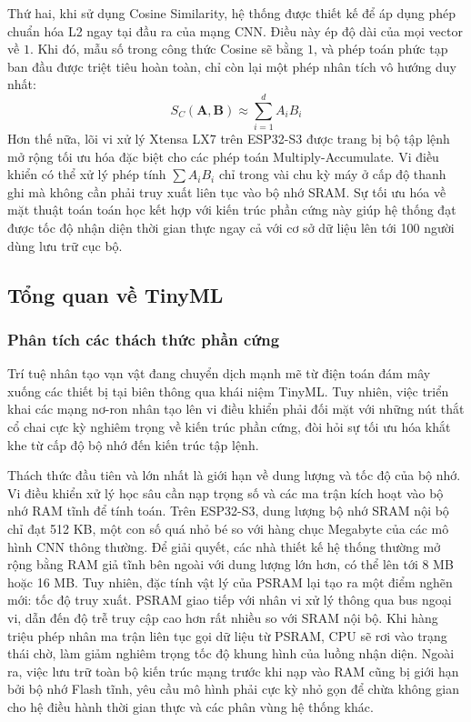 Thứ hai, khi sử dụng Cosine Similarity, hệ thống được thiết kế để áp dụng phép chuẩn hóa L2 ngay tại đầu ra của mạng CNN. Điều này ép độ dài của mọi vector về $1$. Khi đó, mẫu số trong công thức Cosine sẽ bằng $1$, và phép toán phức tạp ban đầu được triệt tiêu hoàn toàn, chỉ còn lại một phép nhân tích vô hướng duy nhất:
$$
S_C(\mathbf{A}, \mathbf{B}) \approx \sum_{i=1}^{d} A_i B_i
$$
Hơn thế nữa, lõi vi xử lý Xtensa LX7 trên ESP32-S3 được trang bị bộ tập lệnh mở rộng tối ưu hóa đặc biệt cho các phép toán Multiply-Accumulate. Vi điều khiển có thể xử lý phép tính $\sum A_i B_i$ chỉ trong vài chu kỳ máy ở cấp độ thanh ghi mà không cần phải truy xuất liên tục vào bộ nhớ SRAM. Sự tối ưu hóa về mặt thuật toán toán học kết hợp với kiến trúc phần cứng này giúp hệ thống đạt được tốc độ nhận diện thời gian thực ngay cả với cơ sở dữ liệu lên tới 100 người dùng lưu trữ cục bộ.

\subsection{Tổng quan về TinyML}

\subsubsection{Phân tích các thách thức phần cứng}
Trí tuệ nhân tạo vạn vật đang chuyển dịch mạnh mẽ từ điện toán đám mây xuống các thiết bị tại biên thông qua khái niệm TinyML. Tuy nhiên, việc triển khai các mạng nơ-ron nhân tạo lên vi điều khiển phải đối mặt với những nút thắt cổ chai cực kỳ nghiêm trọng về kiến trúc phần cứng, đòi hỏi sự tối ưu hóa khắt khe từ cấp độ bộ nhớ đến kiến trúc tập lệnh.

Thách thức đầu tiên và lớn nhất là giới hạn về dung lượng và tốc độ của bộ nhớ. Vi điều khiển xử lý học sâu cần nạp trọng số và các ma trận kích hoạt vào bộ nhớ RAM tĩnh để tính toán. Trên ESP32-S3, dung lượng bộ nhớ SRAM nội bộ chỉ đạt 512 KB, một con số quá nhỏ bé so với hàng chục Megabyte của các mô hình CNN thông thường. Để giải quyết, các nhà thiết kế hệ thống thường mở rộng bằng RAM giả tĩnh bên ngoài với dung lượng lớn hơn, có thể lên tới 8 MB hoặc 16 MB. Tuy nhiên, đặc tính vật lý của PSRAM lại tạo ra một điểm nghẽn mới: tốc độ truy xuất. PSRAM giao tiếp với nhân vi xử lý thông qua bus ngoại vi, dẫn đến độ trễ truy cập cao hơn rất nhiều so với SRAM nội bộ. Khi hàng triệu phép nhân ma trận liên tục gọi dữ liệu từ PSRAM, CPU sẽ rơi vào trạng thái chờ, làm giảm nghiêm trọng tốc độ khung hình của luồng nhận diện. Ngoài ra, việc lưu trữ toàn bộ kiến trúc mạng trước khi nạp vào RAM cũng bị giới hạn bởi bộ nhớ Flash tĩnh, yêu cầu mô hình phải cực kỳ nhỏ gọn để chừa không gian cho hệ điều hành thời gian thực và các phân vùng hệ thống khác.

